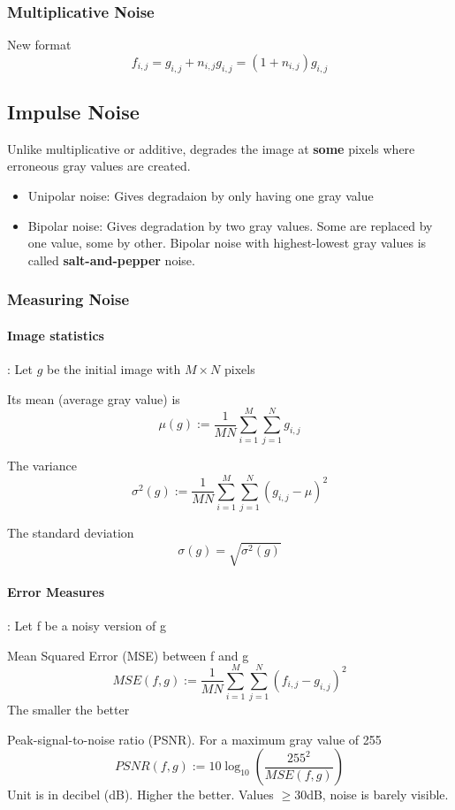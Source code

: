 \documentclass{article}
\begin{document}
\subsubsection{Multiplicative Noise}
New format
\[f_{i,j} = g_{i,j} + n_{i,j}g_{i,j} = (1+n_{i,j})g_{i,j}\]

\subsection{Impulse Noise}
Unlike multiplicative or additive, degrades the image at \textbf{some} pixels where erroneous gray values are created.

\begin{itemize}
  \item Unipolar noise: Gives degradaion by only having one gray value
  \item \label{itm:salt-pepper-noise} Bipolar noise: Gives degradation by two gray values. Some are replaced by one value, some by other. Bipolar noise with highest-lowest gray values is called \textbf{salt-and-pepper} noise.
\end{itemize}

\subsubsection{Measuring Noise}
\paragraph{Image statistics}: Let $g$ be the initial image with $M\times N$ pixels

Its mean (average gray value) is
\[\mu(g) := \frac{1}{MN}\sum_{i=1}^{M}\sum_{j=1}^{N}g_{i,j}\]

The variance 
\[\sigma^2(g) := \frac{1}{MN}\sum_{i=1}^{M}\sum_{j=1}^{N}(g_{i,j} - \mu)^2\]

The standard deviation
\[\sigma(g) = \sqrt{\sigma^2(g)}\]

\paragraph{Error Measures}: Let f be a noisy version of g

Mean Squared Error (MSE) between f and g
\[MSE(f,g) := \frac{1}{MN}\sum_{i=1}^{M}\sum_{j=1}^{N}(f_{i,j} - g_{i,j} )^2\]
The smaller the better

Peak-signal-to-noise ratio (PSNR). For a maximum gray value of 255
\[PSNR(f,g) := 10\log_{10}\left(\frac{255^2}{MSE(f,g)}\right)\]
Unit is in decibel (dB). Higher the better. Values $\geq 30$dB, noise is barely visible.
\end{document}
